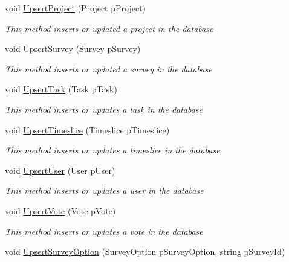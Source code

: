 \begin{DoxyCompactItemize}
\item 
void \hyperlink{class_plex_byte_1_1_mo_cap_1_1_managers_1_1_data_manager_a1d077aca4b859220f0c36084f056c9b0}{Upsert\+Project} (Project p\+Project)
\begin{DoxyCompactList}\small\item\em This method inserts or updated a project in the database \end{DoxyCompactList}\item 
void \hyperlink{class_plex_byte_1_1_mo_cap_1_1_managers_1_1_data_manager_a415c9eb941c5eca0f16d0258eee34ce8}{Upsert\+Survey} (Survey p\+Survey)
\begin{DoxyCompactList}\small\item\em This method inserts or updated a survey in the database \end{DoxyCompactList}\item 
void \hyperlink{class_plex_byte_1_1_mo_cap_1_1_managers_1_1_data_manager_a639dc82717b5a4b3927e1bee01f5fb10}{Upsert\+Task} (Task p\+Task)
\begin{DoxyCompactList}\small\item\em This method inserts or updates a task in the database \end{DoxyCompactList}\item 
void \hyperlink{class_plex_byte_1_1_mo_cap_1_1_managers_1_1_data_manager_a98bcf3a92873150ecb37a47efc064abf}{Upsert\+Timeslice} (Timeslice p\+Timeslice)
\begin{DoxyCompactList}\small\item\em This method inserts or updates a timeslice in the database \end{DoxyCompactList}\item 
void \hyperlink{class_plex_byte_1_1_mo_cap_1_1_managers_1_1_data_manager_af316115c31c5e9a6a9e989cfbc2e7312}{Upsert\+User} (User p\+User)
\begin{DoxyCompactList}\small\item\em This method inserts or updates a user in the database \end{DoxyCompactList}\item 
void \hyperlink{class_plex_byte_1_1_mo_cap_1_1_managers_1_1_data_manager_a88b251e65a17311b05cbfe1c48d152e0}{Upsert\+Vote} (Vote p\+Vote)
\begin{DoxyCompactList}\small\item\em This method inserts or updates a vote in the database \end{DoxyCompactList}\item 
void \hyperlink{class_plex_byte_1_1_mo_cap_1_1_managers_1_1_data_manager_a607b331c483e77e7844d07824bc1cc74}{Upsert\+Survey\+Option} (Survey\+Option p\+Survey\+Option, string p\+Survey\+Id)

\end{DoxyCompactItemize}

